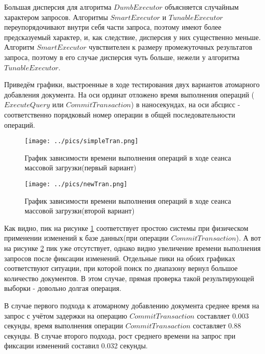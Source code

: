 \documentclass{matmex-diploma}
\begin{document}
        Большая дисперсия для алгоритма $DumbExecutor$ объясняется случайным характером запросов. Алгоритмы $SmartExecutor$ и $TunableExecutor$ переупорядочивают внутри себя части запроса, поэтому имеют более предсказуемый характер, и, как следствие, дисперсия у них существенно меньше. Алгоритм $SmartExecutor$ чувствителен к размеру промежуточных результатов запроса, поэтому в его случае дисперсия чуть больше, нежели у алгоритма $TunableExecutor$.  
        
        Приведём графики, выстроенные в ходе тестирования двух вариантов атомарного добавления документа. На оси ординат отложено время выполнения операций ($ExecuteQuery$ или $CommitTransaction$) в наносекундах, на оси абсцисс - соответственно порядковый номер операции в общей последовательности операций.
        \begin{figure}[H]
            \centering
            \texttt{[image: ../pics/simpleTran.png]}
            \caption{График зависимости времени выполнения операций в ходе сеанса массовой загрузки(первый вариант)}
            \label{simpleTran}
        \end{figure}
        
        \begin{figure}[H]
            \centering
            \texttt{[image: ../pics/newTran.png]}
            \caption{График зависимости времени выполнения операций в ходе сеанса массовой загрузки(второй вариант)}
            \label{newTran}
        \end{figure}
        
        Как видно, пик на рисунке \ref{simpleTran} соответствует простою системы при физическом применении изменений к базе данных(при операции $CommitTransaction$). А вот на рисунке \ref{newTran} пик уже отсутствует, однако видно увеличение времени выполнения запросов после фиксации изменений. Отдельные пики на обоих графиках соответствуют ситуации, при которой поиск по диапазону вернул большое количество документов. В этом случае, прямая проверка такой результирующей выборки - довольно долгая операция.
        
        В случае первого подхода к атомарному добавлению документа среднее время на запрос с учётом задержки на операцию $CommitTransaction$ составляет 0.003 секунды, время выполнения операции $CommitTransaction$ составляет 0.88 секунды. В случае второго подхода, рост среднего времени на запрос при фиксации изменений составил 0.032 секунды.
        
\end{document}
